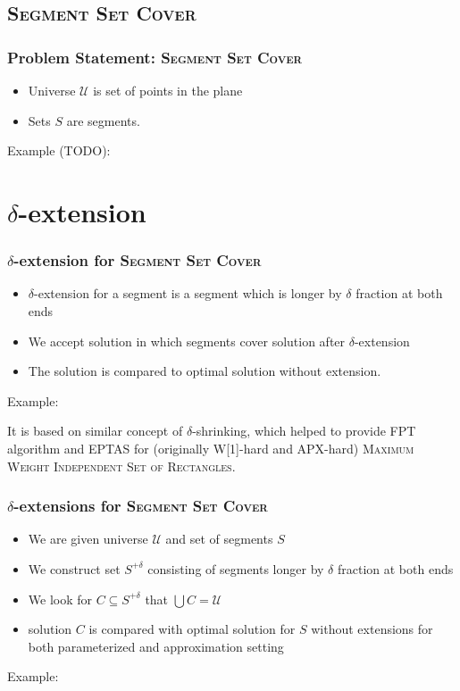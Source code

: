 \documentclass{beamer}
\begin{document}
\subsection{\textsc{Segment Set Cover}}

\begin{frame}
\frametitle{Problem Statement: \textsc{Segment Set Cover}}
\begin{itemize}
\item Universe $\mathcal{U}$ is set of points in the plane
\item Sets $S$ are segments.
\end{itemize}

Example (TODO):




\end{frame}

\section{$\delta$-extension}
\begin{frame}
\frametitle{$\delta$-extension for \textsc{Segment Set Cover}}
\begin{itemize}
\item $\delta$-extension for a segment is a segment which is longer by
$\delta$ fraction at both ends
\item We accept solution in which segments cover solution after
$\delta$-extension
\item The solution is compared to optimal solution without extension.
\end{itemize}

Example:



It is based on similar concept of $\delta$-shrinking,
which helped to provide FPT algorithm and EPTAS for 
(originally W[1]-hard and APX-hard)
\textsc{Maximum Weight Independent Set of Rectangles}.
\end{frame}

\begin{frame}
\frametitle{$\delta$-extensions for \textsc{Segment Set Cover}}
\begin{itemize}
\item We are given universe $\mathcal{U}$ and set of segments $S$
\item We construct set $S^{+\delta}$ consisting of  
segments longer by $\delta$ fraction at both ends
\item We look for $C \subseteq S^{+\delta}$ that $\bigcup C = \mathcal{U}$
\item solution $C$ is compared with optimal solution for $S$ without extensions
for both parameterized and approximation setting
\end{itemize}

Example:


\end{frame}
\end{document}
